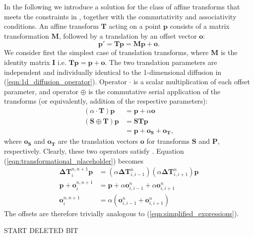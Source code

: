 	  In the following we introduce a solution for the class of affine transforms that meets the constraints in  , together with the commutativity and associativity conditions. An affine transform $\mathbf{T}$ acting on a point $\mathbf{p}$ consists of a matrix transformation $\mathbf{M}$, followed by a translation by an offset vector $\mathbf{o}$:
		\begin{equation}
			\mathbf{p'} = \mathbf{Tp}= \mathbf{Mp} + \mathbf{o}.
		\end{equation}
		We consider first the simplest case of translation transforms, where $\mathbf{M}$ is the identity matrix $\mathbf{I}$ i.e. $\mathbf{Tp} = \mathbf{p} + \mathbf{o}$. The two translation parameters are independent and individually identical to the 1-dimensional diffusion in (\ref{eqn:1d_diffusion_operator}). Operator $\cdot$ is a scalar multiplication of each offset parameter, and operator $\oplus$ is the commutative serial application of the transforms (or equivalently, addition of the respective parameters):
		\begin{align}
			(\alpha \cdot \mathbf{T}) \mathbf{p} &= \mathbf{p} + \alpha\mathbf{o} \label{eqn:translation_cdot}\\
			(\mathbf{S} \oplus \mathbf{T}) \mathbf{p} &= \mathbf{STp} \\
			                                          &= \mathbf{p} + \mathbf{o_S} + \mathbf{o_T} \label{eqn:translation_oplus},
		\end{align}
    where $\mathbf{o_S}$ and $\mathbf{o_T}$ are the translation vectors $\mathbf{o}$ for transforms $\mathbf{S}$ and $\mathbf{P}$, respectively. Clearly, these two operators satisfy . Equation (\ref{eqn:transformational_placeholder}) becomes
		\begin{align}
		 	\mathbf{\Delta T}_i^{n,n+1} \mathbf{p} &= (\alpha \mathbf{\Delta T}_{i,i-1}^n) (\alpha \mathbf{\Delta T}_{i,i+1}^n) \mathbf{p} \\
			\mathbf{p} + \mathbf{o}_i^{n,n+1} &= \mathbf{p} + \alpha \mathbf{o}_{i,i-1}^n + \alpha \mathbf{o}_{i,i+1}^n \\
			\mathbf{o}_i^{n,n+1} &= \alpha (\mathbf{o}_{i,i-1}^n + \mathbf{o}_{i,i+1}^n) 
		\end{align}
		The offsets are therefore trivially analogous to (\ref{eqn:simplified_expressions}).
				
    
    
    START DELETED BIT
    
